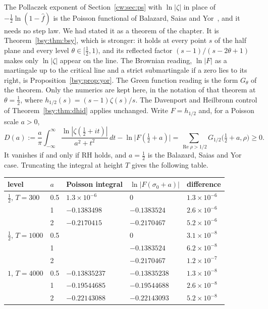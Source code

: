 The Pollaczek exponent of Section~\ref{cw:sec:ps} with $\ln|\zeta|$ in place of $-\frac12\ln(1-\hat f)$ is the Poisson functional of Balazard, Saias and Yor~\cite{BSY99}, and it needs no step law. We had stated it as a theorem of the chapter. It is Theorem~\ref{bsy:thm:bsy}, which is stronger: it holds at every point $s$ of the half plane and every level $\theta\in[\frac12,1)$, and its reflected factor $(s-1)/(s-2\theta+1)$ makes only $\ln|\zeta|$ appear on the line. The Brownian reading, $\ln|F|$ as a martingale up to the critical line and a strict submartingale if a zero lies to its right, is Proposition~\ref{bsy:prop:yor}. The Green function reading is the form $G_\theta$ of the theorem. Only the numerics are kept here, in the notation of that theorem at $\theta=\frac12$, where $h_{1/2}(s)=(s-1)\zeta(s)/s$. The Davenport and Heilbronn control of Theorem~\ref{bsy:thm:dhid} applies unchanged. Write $F=h_{1/2}$ and, for a Poisson scale $a>0$,
\[
D(a):=\frac a\pi\int_{-\infty}^\infty\frac{\ln|\zeta(\frac12+it)|}{a^2+t^2}\,dt-\ln\big|F(\tfrac12+a)\big|=\sum_{\operatorname{Re}\rho>1/2}G_{1/2}\big(\tfrac12+a,\rho\big)\ge0 .
\]
It vanishes if and only if RH holds, and $a=\frac12$ is the Balazard, Saias and Yor case. Truncating the integral at height $T$ gives the following table.
\begin{center}
\small
\begin{tabular}{lllll}
\toprule
level & $a$ & Poisson integral & $\ln|F(\sigma_0+a)|$ & difference\\
\midrule
$\frac12$, $T=300$ & 0.5 & $1.3\times10^{-6}$ & 0 & $1.3\times10^{-6}$\\
 & 1 & $-0.1383498$ & $-0.1383524$ & $2.6\times10^{-6}$\\
 & 2 & $-0.2170415$ & $-0.2170467$ & $5.2\times10^{-6}$\\
$\frac12$, $T=1000$ & 0.5 & & 0 & $3.1\times10^{-8}$\\
 & 1 & & $-0.1383524$ & $6.2\times10^{-8}$\\
 & 2 & & $-0.2170467$ & $1.2\times10^{-7}$\\
$1$, $T=4000$ & 0.5 & $-0.13835237$ & $-0.13835238$ & $1.3\times10^{-8}$\\
 & 1 & $-0.19544685$ & $-0.19544688$ & $2.6\times10^{-8}$\\
 & 2 & $-0.22143088$ & $-0.22143093$ & $5.2\times10^{-8}$\\
\bottomrule
\end{tabular}
\end{center}
